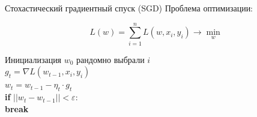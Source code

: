 \documentclass[notes,12pt, aspectratio=169]{beamer}
\newcommand{\pgr}[1]{{\color{green} \textbf{#1}}}
\begin{document}
\begin{frame}[fragile]{Стохастический градиентный спуск (SGD)}
Проблема оптимизации: 

\[   
L(w) = \sum_{i=1}^n L(w, x_i, y_i) \to \min_{w}
\]


Инициализация $w_0$ 
\hspace{15pt} рандомно выбрали $i$ \\
\pgr{\hspace{15pt}} $g_t = \nabla L(w_{t-1}, x_i, y_i)$ \\
\pgr{\hspace{15pt}} $w_t = w _{t-1} - \eta_t \cdot g_t  $ \\
\pgr{\hspace{15pt} if} $||w_t - w_{t-1}|| < \varepsilon:$ \\
\pgr{\hspace{30pt} break}
\end{frame}
\end{document}

